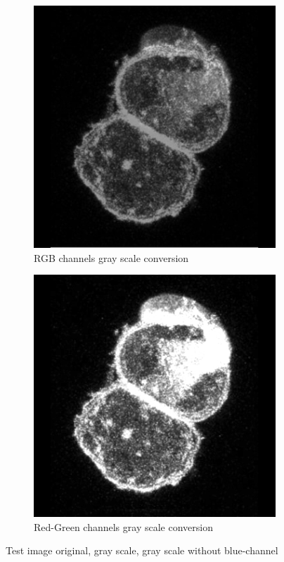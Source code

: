 \documentclass[a4paper,11pt]{ijamas}
\begin{document}
\begin{figure}[!h]
\begin{subfigure}{.48\textwidth}
  \centering
  \includegraphics[width=0.80\columnwidth]{./figs/_2gray.jpg}
 \caption{RGB channels gray scale conversion}
  \label{fig:test_gray}
\end{subfigure}%
\begin{subfigure}{.48\textwidth}
  \centering
  \includegraphics[width=0.80\columnwidth]{./figs/_2chanmixgray.jpg}
 \caption{Red-Green channels gray scale conversion}
  \label{fig:test_chanmixgray}
\end{subfigure}%
\caption{Test image original, gray scale, gray scale without blue-channel}
\end{figure}
\end{document}

